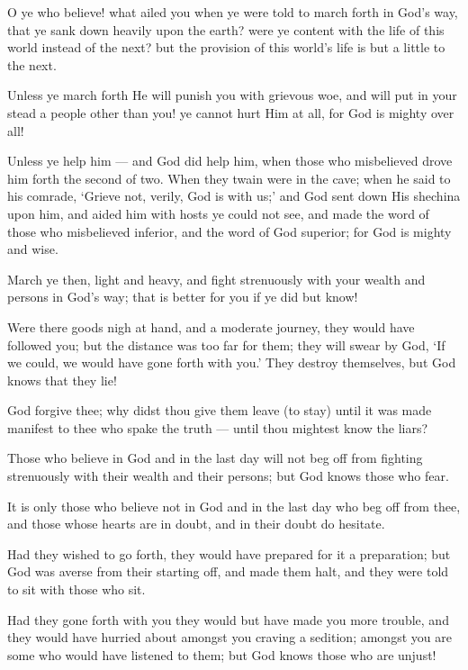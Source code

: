 \documentclass[fontsize=14pt, letterpaper, notitlepage, openany, DIV=12]{scrbook} %
\begin{document}
\noindent[9:38]
O ye who believe! what ailed you when ye were told to march forth in God's way, that ye
sank down heavily upon the earth? were ye content with the life of this world instead of the next?
but the provision of this world's life is but a little to the next.

\noindent[9:39]
Unless ye march forth He will punish you with grievous woe, and will put in your stead a
people other than you! ye cannot hurt Him at all, for God is mighty over all!

\noindent[9:40]
Unless ye help him --- and God did help him, when those who misbelieved drove him
forth the second of two. When they twain were in the cave; when he said to his comrade, `Grieve
not, verily, God is with us;' and God sent down His shechina upon him, and aided him with hosts
ye could not see, and made the word of those who misbelieved inferior, and the word of God
superior; for God is mighty and wise.

\noindent[9:41]
March ye then, light and heavy, and fight strenuously with your wealth and persons in
God's way; that is better for you if ye did but know!

\noindent[9:42]
Were there goods nigh at hand, and a moderate journey, they would have followed you;
but the distance was too far for them; they will swear by God, `If we could, we would have gone
forth with you.' They destroy themselves, but God knows that they lie!

\noindent[9:43]
God forgive thee; why didst thou give them leave (to stay) until it was made manifest to
thee who spake the truth --- until thou mightest know the liars?

\noindent[9:44]
Those who believe in God and in the last day will not beg off from fighting strenuously
with their wealth and their persons; but God knows those who fear.

\noindent[9:45]
It is only those who believe not in God and in the last day who beg off from thee, and
those whose hearts are in doubt, and in their doubt do hesitate.

\noindent[9:46]
Had they wished to go forth, they would have prepared for it a preparation; but God was
averse from their starting off, and made them halt, and they were told to sit with those who sit.

\noindent[9:47]
Had they gone forth with you they would but have made you more trouble, and they
would have hurried about amongst you craving a sedition; amongst you are some who would
have listened to them; but God knows those who are unjust!
\end{document}

